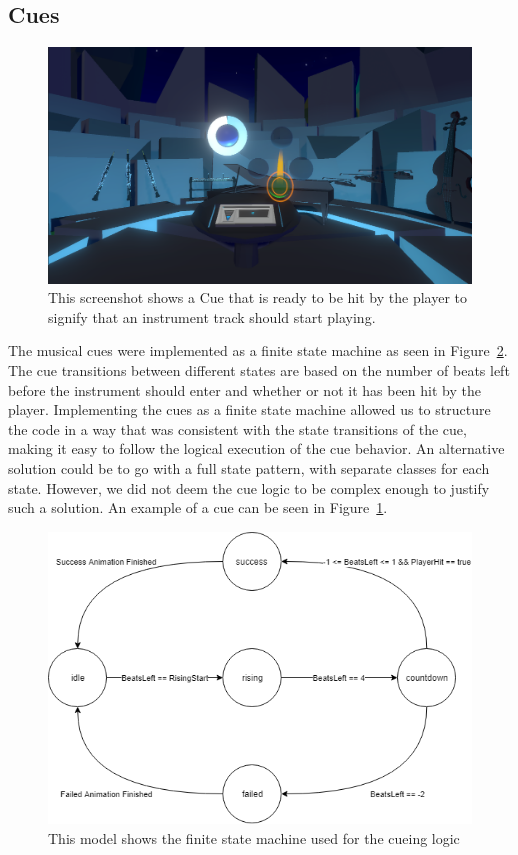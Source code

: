 \subsection{Cues}
\begin{figure}[tbph]
    \centering
    \includegraphics[width=1.0\textwidth]{images/cue}
    \caption[Screenshot of a Cue]{This screenshot shows a Cue that is ready to be hit by the player to signify that an instrument track should start playing.}
    \label{fig:cue}
\end{figure}

The musical cues were implemented as a finite state machine as seen in Figure~\ref{fig:cue_fsm}. The cue transitions between different states are based on the number of beats left before the instrument should enter and whether or not it has been hit by the player. Implementing the cues as a finite state machine allowed us to structure the code in a way that was consistent with the state transitions of the cue, making it easy to follow the logical execution of the cue behavior. 
An alternative solution could be to go with a full state pattern\cite{game_programming_patterns}, with separate classes for each state. However, we did not deem the cue logic to be complex enough to justify such a solution. An example of a cue can be seen in Figure~\ref{fig:cue}.

\begin{figure}[tbph]
    \centering
    \includegraphics[width=1.0\textwidth]{images/cue_fsm}
    \caption[Cue Finite State Machine]{This model shows the finite state machine used for the cueing logic}
    \label{fig:cue_fsm}
\end{figure}


